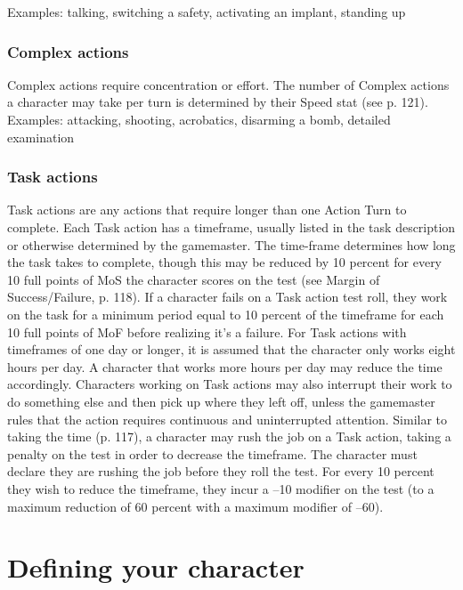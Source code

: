 Examples: talking, switching a safety, activating an implant, standing
up

\subsubsection{Complex actions}
\label{sec:complex-actions}

Complex actions require concentration or effort. The number of Complex
actions a character may take per turn is determined by their Speed
stat (see p. 121).  Examples: attacking, shooting, acrobatics,
disarming a bomb, detailed examination

\subsubsection{Task actions}
\label{sec:task-actions}

Task actions are any actions that require longer than one Action Turn
to complete.  Each Task action has a timeframe, usually listed in the
task description or otherwise determined by the gamemaster. The
time-frame determines how long the task takes to complete, though this
may be reduced by 10 percent for every 10 full points of MoS the
character scores on the test (see Margin of Success/Failure,
p. 118). If a character fails on a Task action test roll, they work on
the task for a minimum period equal to 10 percent of the timeframe for
each 10 full points of MoF before realizing it's a failure.  For Task
actions with timeframes of one day or longer, it is assumed that the
character only works eight hours per day. A character that works more
hours per day may reduce the time accordingly. Characters working on
Task actions may also interrupt their work to do something else and
then pick up where they left off, unless the gamemaster rules that the
action requires continuous and uninterrupted attention.  Similar to
taking the time (p. 117), a character may rush the job on a Task
action, taking a penalty on the test in order to decrease the
timeframe. The character must declare they are rushing the job before
they roll the test. For every 10 percent they wish to reduce the
timeframe, they incur a –10 modifier on the test (to a maximum
reduction of 60 percent with a maximum modifier of –60).

\section{Defining your character}
\label{sec:defin-your-char}

